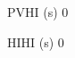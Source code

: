  
 
 
 
 
 
 
 
 
 
 
 
 
 
 
PVHI (s)
0
 
 
 
 
 
 
 
 
 
 
 
 
 
 
 
 
HIHI (s)
0
 
 
 
 
 
 
 
 
 
 
 
 
 
 
 
 
 
